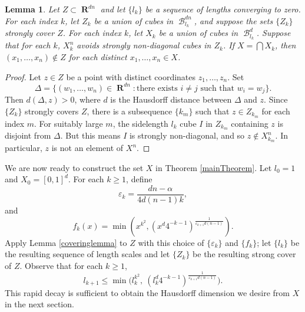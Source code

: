 \documentclass[dvipsnames,letterpaper,12pt]{article}
\numberwithin{equation}{section}
\theoremstyle{plain}
\newtheorem{lemma}{Lemma}
\DeclareMathOperator{\RR}{\mathbf{R}}
\DeclareMathOperator{\B}{\mathcal{B}}
\begin{document}
\begin{lemma} \label{stronglydiagonal}
	Let $Z \subset \RR^{dn}$ and let $\{ l_k \}$ be a sequence of lengths converging to zero. For each index $k$, let $Z_k$ be a union of cubes in $\B^{dn}_{l_k}$, and suppose the sets $\{ Z_k \}$ strongly cover $Z$. For each index $k$, let $X_k$ be a union of cubes in $\B^d_{l_k}$. Suppose that for each $k$, $X_k^n$ avoids strongly non-diagonal cubes in $Z_k$. If $X = \bigcap X_k$, then $(x_1, \dots, x_n) \not \in Z$ for each distinct $x_1, \dots, x_n \in X$.
\end{lemma}
\begin{proof}
	Let $z \in Z$ be a point with distinct coordinates $z_1, \dots, z_n$. Set
	\[ \Delta = \{ (w_1, \dots, w_n) \in \RR^{dn}: \text{there exists $i \neq j$ such that $w_i = w_j$} \}. \]
	Then $d(\Delta,z) > 0$, where $d$ is the Hausdorff distance between $\Delta$ and $z$. Since $\{ Z_k \}$ strongly covers $Z$, there is a subsequence $\{ k_m \}$ such that $z \in Z_{k_m}$ for each index $m$. For suitably large $m$, the sidelength $l_k$ cube $I$ in $Z_{k_m}$ containing $z$ is disjoint from $\Delta$. But this means $I$ is strongly non-diagonal, and so $z \not \in X_{k_m}^n$. In particular, $z$ is not an element of $X^n$.
\end{proof}


We are now ready to construct the set $X$ in Theorem \ref{mainTheorem}. Let $l_0 = 1$ and $X_0 = [0,1]^d$. For each $k\geq 1$, define 
%
\begin{equation}\label{defnVarepsK}
	\varepsilon_k = \frac{dn - \alpha}{4d(n-1)k},
\end{equation}
%
and
%
\begin{equation}\label{defnFK}
	f_k(x)=\min \left( x^{k^2}, (x^d4^{-k-1})^{\frac{1}{\varepsilon_{k+1}d(n-1)}} \right).
\end{equation}
%
Apply Lemma \ref{coveringlemma} to $Z$ with this choice of $\{\varepsilon_k\}$ and $\{f_k\}$; let $\{l_k\}$ be the resulting sequence of length scales and let $\{Z_k\}$ be the resulting strong cover of $Z$. Observe that for each $k\geq 1$,
%
\begin{equation}\label{boundOnLk}
	l_{k+1} \leq \min \Big(l_k^{k^2},\ (l_k^d4^{-k-1})^{\frac{1}{\varepsilon_{k+1}d(n-1)}} \Big).
\end{equation}
%
This rapid decay is sufficient to obtain the Hausdorff dimension we desire from $X$ in the next section.
\end{document}
